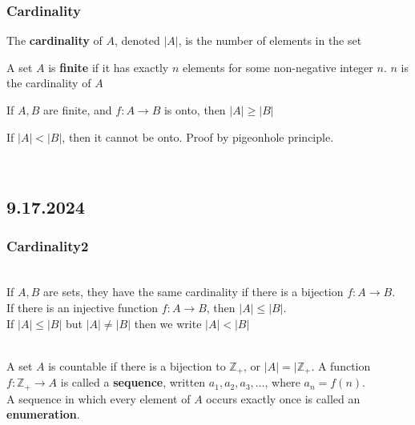 \documentclass[11pt]{scrartcl}
\begin{document}
\subsubsection{Cardinality}
\begin{definition}[Cardinality]
    The \textbf{cardinality} of $A$, denoted $|A|$, is the number of elements in the set
\end{definition}
\begin{definition}
    A set $A$ is \textbf{finite} if it has exactly $n$ elements for some non-negative integer $n$. $n$ is the cardinality of $A$
\end{definition}
\begin{proposition}
    If $A, B$ are finite, and $f: A\rightarrow B$ is onto, then $|A| \geq |B|$
\end{proposition}
\begin{example}
    If $|A| < |B|$, then it cannot be onto.  Proof by pigeonhole principle.
\end{example}
\noindent
\Line
\\
\subsection{9.17.2024}
\subsubsection{Cardinality2}
\begin{definition}\\
    If $A, B$ are sets, they have the same cardinality if there is a bijection $f:A \rightarrow B$. \\
    If there is an injective function $f:A \rightarrow B$, then $|A| \leq |B|$.\\
    If $|A| \leq |B|$ but $|A| \neq |B|$ then we write $|A| < |B|$
    
\end{definition}

\begin{definition}[Countability]\\
    A set $A$ is countable if there is a bijection to $\mathbb{Z}_+$, or $|A| = |\mathbb{Z}_+$.  A function $f: \mathbb{Z}_+ \rightarrow A$ is called a \textbf{sequence}, written $a_1, a_2, a_3, \dots$, where $a_n = f(n)$.\\
    A sequence in which every element of $A$ occurs exactly once is called an \textbf{enumeration}.
\end{definition}
\end{document}
